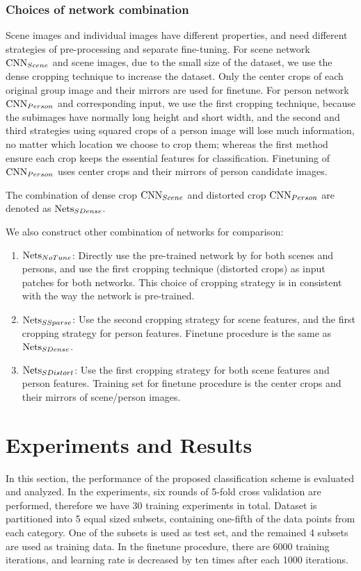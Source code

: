 \documentclass[10pt,twocolumn,letterpaper]{article}
\begin{document}
\subsubsection{Choices of network combination}
\label{sectionmethods}
Scene images and individual images have different properties, and need different strategies of pre-processing and separate fine-tuning. For scene network $\textup{CNN}_{Scene}$ and scene images, due to the small size of the dataset, we use the dense cropping technique to increase the dataset. Only the center crops of each original group image and their mirrors are used for finetune.  For person network $\textup{CNN}_{Person}$ and corresponding input, we use the first cropping technique, because the subimages have normally long height and short width, and the second and third strategies using squared crops of a person image will lose much information, no matter which location we choose to crop them; whereas the first method ensure each crop keeps the essential features for classification. Finetuning of $\textup{CNN}_{Person}$ uses center crops and their mirrors of person candidate images. 

The combination of dense crop $\textup{CNN}_{Scene}$ and distorted crop $\textup{CNN}_{Person}$ are denoted as $\textup{Nets}_{SDense}$.

We also construct other combination of networks for comparison:
\begin{enumerate}
\item $\textup{Nets}_{NoTune}$: Directly use the pre-trained network by \cite{caffe} for both scenes and persons, and use the first cropping technique (distorted crops) as input patches for both networks. This choice of cropping strategy is in consistent with the way the network is pre-trained.
\item $\textup{Nets}_{SSparse}$: Use the second cropping strategy for scene features, and the first cropping strategy for person features. Finetune procedure is the same as $\textup{Nets}_{SDense}$.
\item $\textup{Nets}_{SDistort}$: Use the first cropping strategy for both scene features and person features. Training set for finetune procedure is the center crops and their mirrors of scene/person images.
\end{enumerate}


\section{Experiments and Results}
In this section, the performance of the proposed classification scheme is evaluated and analyzed. In the experiments, six rounds of 5-fold cross validation are performed, therefore we have 30 training experiments in total. Dataset is partitioned into 5 equal sized subsets, containing one-fifth of the data points from each category. One of the subsets is used as test set, and the remained 4 subsets are used as training data. In the finetune procedure, there are 6000 training iterations, and learning rate is decreased by ten times after each 1000 iterations.
\end{document}

